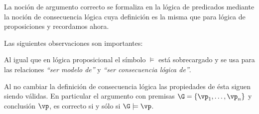 \documentclass[11pt,letterpaper]{article}
\begin{document}
La noción de argumento correcto se formaliza en la lógica de predicados mediante 
la noción de consecuencia lógica cuya definición es la misma que para lógica de 
proposiciones y recordamos ahora.


  
\noindent Las siguientes observaciones son importantes:
\be
\item Al igual que en lógica proposicional el símbolo $\models$ está
  sobrecargado y se usa para las relaciones \emph{``ser modelo de''} y
  \emph{``ser consecuencia lógica de''}.
\item Al no cambiar la definición de consecuencia lógica las
  propiedades de ésta siguen siendo válidas.
En particular el argumento con premisas $\G=\{\vp_1,\ldots,\vp_n\}$ y
conclusión $\vp$, es correcto si y sólo si $\G\models\vp$.
\ee
\end{document}
